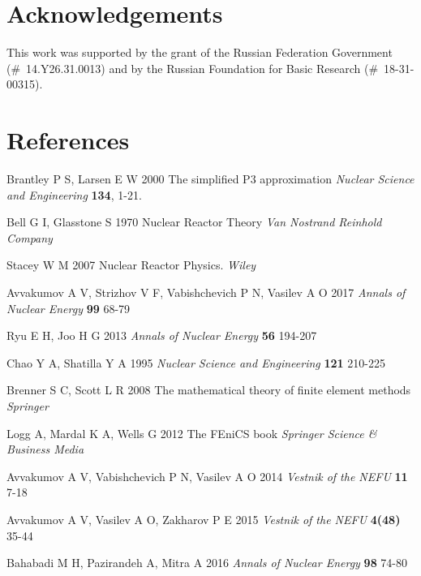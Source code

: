 \documentclass[a4paper]{jpconf}
\begin{document}
\section*{Acknowledgements}

This work was supported by the grant of the Russian Federation Government (\#~14.Y26.31.0013) and by the Russian Foundation for Basic Research (\#~18-31-00315).

\section*{References}
\begin{thebibliography}{9}
 Brantley P S, Larsen E W 2000 The simplified P3 approximation {\it Nuclear Science and Engineering} {\bf 134}, 1-21.

Bell G I, Glasstone S 1970 Nuclear Reactor Theory {\it Van Nostrand Reinhold Company}

Stacey W M 2007 Nuclear Reactor Physics. {\it Wiley}

Avvakumov A V, Strizhov V F, Vabishchevich P N, Vasilev A O 2017 {\it Annals of Nuclear Energy} {\bf 99} 68-79

Ryu E H, Joo H G 2013 {\it Annals of Nuclear Energy} {\bf 56} 194-207

Chao Y A, Shatilla Y A 1995 {\it Nuclear Science and Engineering} {\bf 121} 210-225

Brenner S C, Scott L R 2008 The mathematical theory of finite element
methods {\it Springer}

Logg A, Mardal K A, Wells G 2012 The FEniCS book {\it Springer Science \& Business Media}

Avvakumov A V, Vabishchevich P N, Vasilev A O 2014 {\it Vestnik
of the NEFU} {\bf 11} 7-18

Avvakumov A V, Vasilev A O, Zakharov P E 2015 {\it Vestnik of
the NEFU} {\bf 4(48)} 35-44

Bahabadi M H, Pazirandeh A, Mitra A 2016 {\it Annals of Nuclear Energy} {\bf 98} 74-80

\end{thebibliography}
\end{document}
